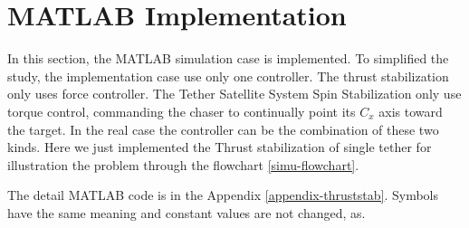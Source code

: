 \section{MATLAB Implementation}
In this section, the MATLAB simulation case is implemented. To simplified the study, the implementation case use only one controller. The thrust stabilization only uses force controller. The Tether Satellite System Spin Stabilization only use torque control, commanding the chaser to continually point its $C_x$  axis toward the target. In the real case the controller can be the combination of these two kinds. Here we just implemented the Thrust stabilization of single tether for illustration the problem through the flowchart \ref{simu-flowchart}.

The detail MATLAB code is in the Appendix \ref{appendix-thruststab}. Symbols have the same meaning and constant values are not changed, as\cite{hovell2017experimental}. 

